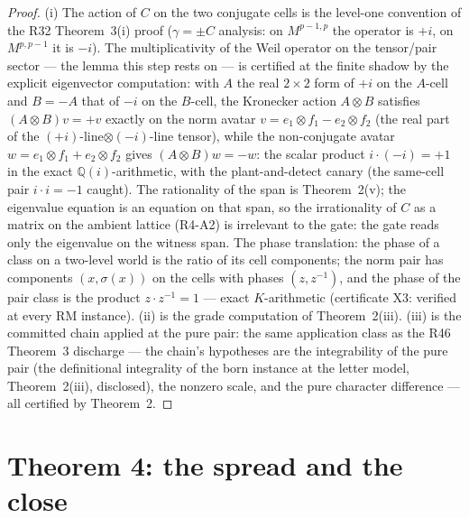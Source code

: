 \documentclass[11pt]{article}
\theoremstyle{definition}
\begin{document}
\begin{proof}
(i) The action of $C$ on the two conjugate cells is the level-one
convention of the R32 Theorem~3(i) proof ($\gamma=\pm C$ analysis: on
$M^{p-1,p}$ the operator is $+i$, on $M^{p,p-1}$ it is $-i$). The
multiplicativity of the Weil operator on the tensor/pair sector --- the
lemma this step rests on --- is certified at the finite shadow by the
explicit eigenvector computation: with $A$ the real $2\times2$ form of
$+i$ on the $A$-cell and $B=-A$ that of $-i$ on the $B$-cell, the
Kronecker action $A\otimes B$ satisfies $(A\otimes B)v=+v$ exactly on
the norm avatar $v=e_1\otimes f_1-e_2\otimes f_2$ (the real part of the
$(+i)$-line$\otimes(-i)$-line tensor), while the non-conjugate avatar
$w=e_1\otimes f_1+e_2\otimes f_2$ gives $(A\otimes B)w=-w$: the scalar
product $i\cdot(-i)=+1$ in the exact $\mathbb{Q}(i)$-arithmetic, with
the plant-and-detect canary (the same-cell pair $i\cdot i=-1$ caught).
The rationality of the span is Theorem~2(v); the eigenvalue equation is
an equation on that span, so the irrationality of $C$ as a matrix on
the ambient lattice (R4-A2) is irrelevant to the gate: the gate reads
only the eigenvalue on the witness span. The phase translation: the
phase of a class on a two-level world is the ratio of its cell
components; the norm pair has components $(x,\sigma(x))$ on the cells
with phases $(z,z^{-1})$, and the phase of the pair class is the
product $z\cdot z^{-1}=1$ --- exact $K$-arithmetic (certificate X3:
verified at every RM instance). (ii) is the grade computation of
Theorem~2(iii). (iii) is the committed chain applied at the pure pair:
the same application class as the R46 Theorem~3 discharge --- the
chain's hypotheses are the integrability of the pure pair (the
definitional integrality of the born instance at the letter model,
Theorem~2(iii), disclosed), the nonzero scale, and the pure character
difference --- all certified by Theorem~2.
\end{proof}

\section{Theorem 4: the spread and the close}
\end{document}
